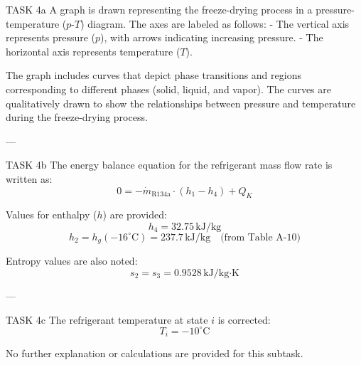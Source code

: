 TASK 4a  
A graph is drawn representing the freeze-drying process in a pressure-temperature (\(p\)-\(T\)) diagram. The axes are labeled as follows:  
- The vertical axis represents pressure (\(p\)), with arrows indicating increasing pressure.  
- The horizontal axis represents temperature (\(T\)).  

The graph includes curves that depict phase transitions and regions corresponding to different phases (solid, liquid, and vapor). The curves are qualitatively drawn to show the relationships between pressure and temperature during the freeze-drying process.

---

TASK 4b  
The energy balance equation for the refrigerant mass flow rate is written as:  
\[
0 = -\dot{m}_{\text{R134a}} \cdot \left( h_1 - h_4 \right) + Q_K
\]  

Values for enthalpy (\(h\)) are provided:  
\[
h_4 = 32.75 \, \text{kJ/kg}
\]  
\[
h_2 = h_g(-16^\circ\text{C}) = 237.7 \, \text{kJ/kg} \quad \text{(from Table A-10)}
\]  

Entropy values are also noted:  
\[
s_2 = s_3 = 0.9528 \, \text{kJ/kg·K}
\]  

---

TASK 4c  
The refrigerant temperature at state \(i\) is corrected:  
\[
T_i = -10^\circ\text{C}
\]  

No further explanation or calculations are provided for this subtask.  

